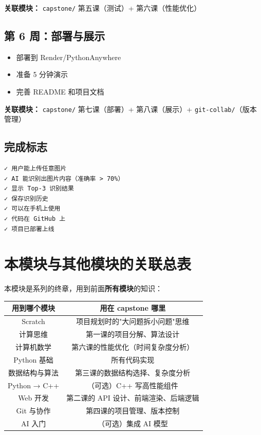 \documentclass[a4paper,12pt]{ctexart}
\begin{document}
\textbf{关联模块：} \texttt{capstone/} 第五课（测试）+ 第六课（性能优化）

\subsection*{第 6 周：部署与展示}

\begin{itemize}
  \item 部署到 Render/PythonAnywhere
  \item 准备 5 分钟演示
  \item 完善 README 和项目文档
\end{itemize}

\textbf{关联模块：} \texttt{capstone/} 第七课（部署）+ 第八课（展示）+ \texttt{git-collab/}（版本管理）

\subsection*{完成标志}

\begin{lstlisting}
✓ 用户能上传任意图片
✓ AI 能识别出图片内容（准确率 > 70%）
✓ 显示 Top-3 识别结果
✓ 保存识别历史
✓ 可以在手机上使用
✓ 代码在 GitHub 上
✓ 项目已部署上线
\end{lstlisting}

\section*{本模块与其他模块的关联总表}

本模块是系列的终章，用到前面\textbf{所有模块}的知识：

\begin{center}
\begin{tabular}{|c|c|}
\hline
\textbf{用到哪个模块} & \textbf{用在 capstone 哪里} \\ \hline
Scratch & 项目规划时的"大问题拆小问题"思维 \\ \hline
计算思维 & 第一课的项目分解、算法设计 \\ \hline
计算机数学 & 第六课的性能优化（时间复杂度分析） \\ \hline
Python 基础 & 所有代码实现 \\ \hline
数据结构与算法 & 第三课的数据结构选择、复杂度分析 \\ \hline
Python → C++ & （可选）C++ 写高性能组件 \\ \hline
Web 开发 & 第二课的 API 设计、前端渲染、后端逻辑 \\ \hline
Git 与协作 & 第四课的项目管理、版本控制 \\ \hline
AI 入门 & （可选）集成 AI 模型 \\ \hline
\end{tabular}
\end{center}
\end{document}
